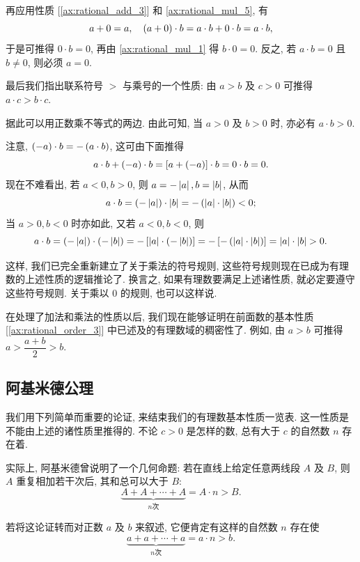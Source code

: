 再应用性质 [\ref{ax:rational_add_3}] 和 \ref{ax:rational_mul_5}, 有
$$
a + 0 = a, \quad \left( a + 0 \right) \cdot b = a \cdot b + 0 \cdot b = a \cdot b,
$$
于是可推得 $0 \cdot b = 0$, 再由 \ref{ax:rational_mul_1} 得 $b \cdot 0 = 0$.
反之, 若 $a \cdot b = 0$ 且 $b \neq 0$, 则必须 $a = 0$.

最后我们指出联系符号 $>$ 与乘号的一个性质:
{\kaishu
    \label{ax:mul_6} 由 $a > b$ 及 $c > 0$ 可推得 $a \cdot c > b \cdot c$.
}

据此可以用正数乘不等式的两边.
由此可知, 当 $a > 0$ 及 $b > 0$ 时, 亦必有 $a \cdot b > 0$.

注意, $\left( -a \right) \cdot b = -\left( a \cdot b \right)$, 这可由下面推得
$$
a \cdot b + \left( -a \right) \cdot b = \left[ a + \left( -a \right) \right] \cdot b = 0 \cdot b = 0.
$$
现在不难看出, 若 $a < 0, b > 0$, 则 $a = -\left| a \right|, b = \left| b \right|$, 从而
$$
a \cdot b = \left( -\left| a \right| \right) \cdot \left| b \right| = -\left( \left| a \right| \cdot \left| b \right| \right) < 0;
$$
当 $a > 0, b < 0$ 时亦如此, 又若 $a < 0, b < 0$, 则
$$
a \cdot b = \left( -\left| a \right| \right) \cdot \left( -\left| b \right| \right) = -\left[ \left| a \right| \cdot \left( -\left| b \right| \right) \right] = -\left[ -\left( \left| a \right| \cdot \left| b \right| \right) \right] = \left| a \right| \cdot \left| b \right| > 0.
$$

这样, 我们已完全重新建立了关于乘法的符号规则, 这些符号规则现在已成为有理数的上述性质的逻辑推论了.
换言之, 如果有理数要满足上述诸性质, 就必定要遵守这些符号规则.
关于乘以 $0$ 的规则, 也可以这样说.

在处理了加法和乘法的性质以后, 我们现在能够证明在前面数的基本性质 [\ref{ax:rational_order_3}] 中已述及的有理数域的稠密性了.
例如, 由 $a > b$ 可推得 $a > \dfrac{a+b}{2} > b$.

\subsection{阿基米德公理} \label{subsec:5}

我们用下列简单而重要的论证, 来结束我们的有理数基本性质一览表.
这一性质是不能由上述的诸性质里推得的.
{\kaishu
    \label{ax:archimedes} 不论 $c > 0$ 是怎样的数, 总有大于 $c$ 的自然数 $n$ 存在着.
}

实际上, 阿基米德曾说明了一个几何命题:
{\kaishu
若在直线上给定任意两线段 $A$ 及 $B$, 则 $A$ 重复相加若干次后, 其和总可以大于 $B$:
$$
\underbrace{A + A + \cdots + A}_{n \text{次}} = A \cdot n > B.
$$
}

若将这论证转而对正数 $a$ 及 $b$ 来叙述, 它便肯定有这样的自然数 $n$ 存在使
$$\underbrace{a + a + \cdots + a}_{n \text{次}} = a \cdot n > b.$$

